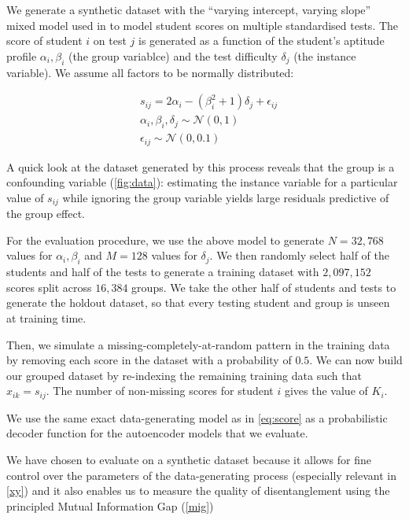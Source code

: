 \documentclass[nohyperref]{article}
\theoremstyle{plain}
\theoremstyle{definition}
\theoremstyle{remark}
\begin{document}
We generate a synthetic dataset with the ``varying intercept, varying slope'' mixed model used in \citet{Gelman2006Data} to model student scores on multiple standardised tests. The score of student $i$ on test $j$ is generated as a function of the student's aptitude profile $\alpha_i, \beta_i$ (the group variablce) and the test difficulty $\delta_j$ (the instance variable). We assume all factors to be normally distributed:

\begin{align} \label{eq:score}
& s_{ij} = 2 \alpha_i - (\beta_i^2 + 1) \delta_j + \epsilon_{ij} \\
& \alpha_i, \beta_i, \delta_j \sim \mathcal{N} (0,1) \\
& \epsilon_{ij} \sim \mathcal{N} (0, 0.1)
\end{align}

A quick look at the dataset generated by this process reveals that the group is a confounding variable (\cref{fig:data}): estimating the instance variable for a particular value of $s_{ij}$ while ignoring the group variable yields large residuals predictive of the group effect.

For the evaluation procedure, we use the above model to generate $N=32,768$ values for $\alpha_i, \beta_i$ and $M=128$ values for $\delta_j$. We then randomly select half of the students and half of the tests to generate a training dataset with $2,097,152$ scores split across $16,384$ groups. We take the other half of students and tests to generate the holdout dataset, so that every testing student and group is unseen at training time. 

Then, we simulate a missing-completely-at-random pattern \citep{Rubin1975InferenceAM} in the training data by removing each score in the dataset with a probability of $0.5$.  We can now build our grouped dataset by re-indexing the remaining training data such that $x_{ik} = s_{ij}$. The number of non-missing scores for student $i$ gives the value of $K_i$.

We use the same exact data-generating model as in \cref{eq:score} as a probabilistic decoder function for the autoencoder models that we evaluate.

We have chosen to evaluate on a synthetic dataset because it allows for fine control over the parameters of the data-generating process (especially relevant in \cref{xy}) and it also enables us to measure the quality of disentanglement using the principled Mutual Information Gap (\cref{mig})
\end{document}
